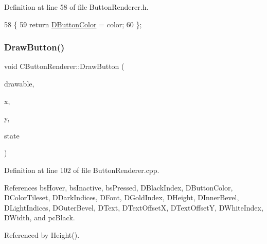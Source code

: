 Definition at line 58 of file Button\+Renderer.\+h.


\begin{DoxyCode}
58                                                     \{
59             \textcolor{keywordflow}{return} \hyperlink{classCButtonRenderer_a8b2bce7400657eb1a8f896b070d11996}{DButtonColor} = color;
60         \};
\end{DoxyCode}
\hypertarget{classCButtonRenderer_a9f29dd6d2243ddae58211706cc6b37b6}{}\label{classCButtonRenderer_a9f29dd6d2243ddae58211706cc6b37b6} 
\subsubsection{\texorpdfstring{Draw\+Button()}{DrawButton()}}
{\footnotesize\ttfamily void C\+Button\+Renderer\+::\+Draw\+Button (\begin{DoxyParamCaption}\item[{Gdk\+Drawable $\ast$}]{drawable,  }\item[{int}]{x,  }\item[{int}]{y,  }\item[{\hyperlink{classCButtonRenderer_ae0eccda184600f6e14bfd59033e5e9a1}{E\+Button\+State}}]{state }\end{DoxyParamCaption})}



Definition at line 102 of file Button\+Renderer.\+cpp.



References bs\+Hover, bs\+Inactive, bs\+Pressed, D\+Black\+Index, D\+Button\+Color, D\+Color\+Tileset, D\+Dark\+Indices, D\+Font, D\+Gold\+Index, D\+Height, D\+Inner\+Bevel, D\+Light\+Indices, D\+Outer\+Bevel, D\+Text, D\+Text\+OffsetX, D\+Text\+OffsetY, D\+White\+Index, D\+Width, and pc\+Black.



Referenced by Height().


